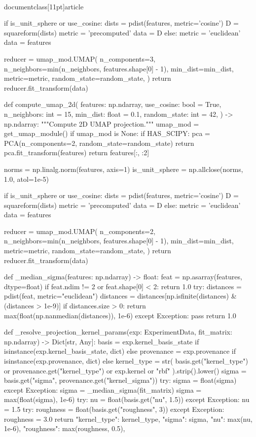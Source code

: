 \\documentclass[11pt]{article}
\begin{document}
\begin{CodeBlock}
    if is_unit_sphere or use_cosine:
        dists = pdist(features, metric='cosine')
        D = squareform(dists)
        metric = 'precomputed'
        data = D
    else:
        metric = 'euclidean'
        data = features

    reducer = umap_mod.UMAP(
        n_components=3,
        n_neighbors=min(n_neighbors, features.shape[0] - 1),
        min_dist=min_dist,
        metric=metric,
        random_state=random_state,
    )
    return reducer.fit_transform(data)


def compute_umap_2d(
    features: np.ndarray,
    use_cosine: bool = True,
    n_neighbors: int = 15,
    min_dist: float = 0.1,
    random_state: int = 42,
) -> np.ndarray:
    """Compute 2D UMAP projection."""
    umap_mod = get_umap_module()
    if umap_mod is None:
        if HAS_SCIPY:
            pca = PCA(n_components=2, random_state=random_state)
            return pca.fit_transform(features)
        return features[:, :2]

    norms = np.linalg.norm(features, axis=1)
    is_unit_sphere = np.allclose(norms, 1.0, atol=1e-5)

    if is_unit_sphere or use_cosine:
        dists = pdist(features, metric='cosine')
        D = squareform(dists)
        metric = 'precomputed'
        data = D
    else:
        metric = 'euclidean'
        data = features

    reducer = umap_mod.UMAP(
        n_components=2,
        n_neighbors=min(n_neighbors, features.shape[0] - 1),
        min_dist=min_dist,
        metric=metric,
        random_state=random_state,
    )
    return reducer.fit_transform(data)


def _median_sigma(features: np.ndarray) -> float:
    feat = np.asarray(features, dtype=float)
    if feat.ndim != 2 or feat.shape[0] < 2:
        return 1.0
    try:
        distances = pdist(feat, metric="euclidean")
        distances = distances[np.isfinite(distances) & (distances > 1e-9)]
        if distances.size > 0:
            return max(float(np.nanmedian(distances)), 1e-6)
    except Exception:
        pass
    return 1.0


def _resolve_projection_kernel_params(exp: ExperimentData, fit_matrix: np.ndarray) -> Dict[str, Any]:
    basis = exp.kernel_basis_state if isinstance(exp.kernel_basis_state, dict) else {}
    provenance = exp.provenance if isinstance(exp.provenance, dict) else {}
    kernel_type = str(
        basis.get("kernel_type")
        or provenance.get("kernel_type")
        or exp.kernel
        or "rbf"
    ).strip().lower()
    sigma = basis.get("sigma", provenance.get("kernel_sigma"))
    try:
        sigma = float(sigma)
    except Exception:
        sigma = _median_sigma(fit_matrix)
    sigma = max(float(sigma), 1e-6)
    try:
        nu = float(basis.get("nu", 1.5))
    except Exception:
        nu = 1.5
    try:
        roughness = float(basis.get("roughness", 3))
    except Exception:
        roughness = 3.0
    return {
        "kernel_type": kernel_type,
        "sigma": sigma,
        "nu": max(nu, 1e-6),
        "roughness": max(roughness, 0.5),
    }



\end{CodeBlock}
\end{document}
